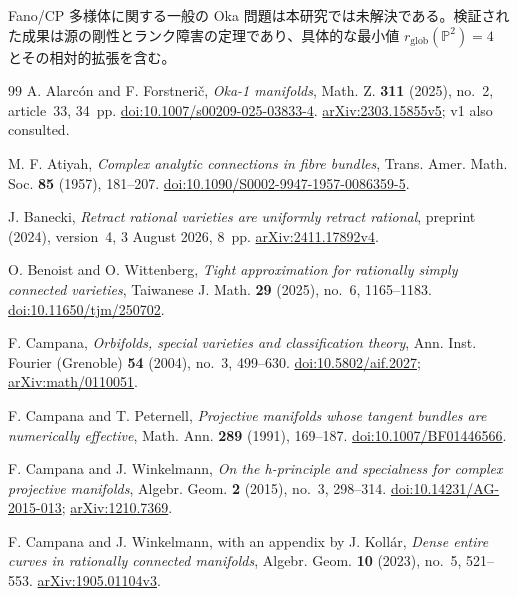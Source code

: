 \documentclass[12pt]{amsart}
\theoremstyle{definition}
\theoremstyle{remark}
\numberwithin{equation}{section}
\newcommand{\mP}{\mathbb{P}}
\begin{document}
Fano/CP 多様体に関する一般の Oka 問題は本研究では未解決である。検証された成果は源の剛性とランク障害の定理であり、具体的な最小値 $r_{\mathrm{glob}}(\mP^2)=4$ とその相対的拡張を含む。

\renewcommand{\refname}{参考文献}
\begin{thebibliography}{99}
A. Alarc\'on and F. Forstneri\v c,
\emph{Oka-1 manifolds}, Math. Z. \textbf{311} (2025), no.~2, article~33, 34~pp.
\href{https://doi.org/10.1007/s00209-025-03833-4}{doi:10.1007/s00209-025-03833-4}.
\href{https://arxiv.org/abs/2303.15855v5}{arXiv:2303.15855v5}; v1 also consulted.

M. F. Atiyah, \emph{Complex analytic connections in fibre bundles},
Trans. Amer. Math. Soc. \textbf{85} (1957), 181--207.
\href{https://doi.org/10.1090/S0002-9947-1957-0086359-5}{doi:10.1090/S0002-9947-1957-0086359-5}.

J. Banecki, \emph{Retract rational varieties are uniformly retract rational},
preprint (2024), version~4, 3 August 2026, 8~pp.
\href{https://arxiv.org/abs/2411.17892v4}{arXiv:2411.17892v4}.

O. Benoist and O. Wittenberg,
\emph{Tight approximation for rationally simply connected varieties},
Taiwanese J. Math. \textbf{29} (2025), no.~6, 1165--1183.
\href{https://doi.org/10.11650/tjm/250702}{doi:10.11650/tjm/250702}.

F. Campana, \emph{Orbifolds, special varieties and classification theory},
Ann. Inst. Fourier (Grenoble) \textbf{54} (2004), no.~3, 499--630.
\href{https://doi.org/10.5802/aif.2027}{doi:10.5802/aif.2027};
\href{https://arxiv.org/abs/math/0110051}{arXiv:math/0110051}.

F. Campana and T. Peternell,
\emph{Projective manifolds whose tangent bundles are numerically effective},
Math. Ann. \textbf{289} (1991), 169--187.
\href{https://doi.org/10.1007/BF01446566}{doi:10.1007/BF01446566}.

F. Campana and J. Winkelmann,
\emph{On the h-principle and specialness for complex projective manifolds},
Algebr. Geom. \textbf{2} (2015), no.~3, 298--314.
\href{https://doi.org/10.14231/AG-2015-013}{doi:10.14231/AG-2015-013};
\href{https://arxiv.org/abs/1210.7369}{arXiv:1210.7369}.

F. Campana and J. Winkelmann, with an appendix by J. Koll\'ar,
\emph{Dense entire curves in rationally connected manifolds},
Algebr. Geom. \textbf{10} (2023), no.~5, 521--553.
\href{https://arxiv.org/abs/1905.01104v3}{arXiv:1905.01104v3}.


\end{thebibliography}
\end{document}
